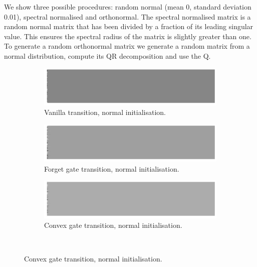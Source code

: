 We show three possible procedures: random normal (mean 0, standard deviation 0.01), spectral
normalised and orthonormal. The spectral normalised matrix is a random normal matrix that
has been divided by a fraction of its leading singular value. This ensures the spectral
radius of the matrix is slightly greater than one. To generate a random orthonormal matrix
we generate a random matrix from a normal distribution, compute its QR decomposition and use the
Q.

\begin{figure}
\centering
\begin{subfigure}[t]{0.3\textwidth}
\includegraphics[width=\textwidth]{appendix/init/vanillanormal}
\caption{Vanilla transition, normal initialisation.}
\end{subfigure}\hfill
\begin{subfigure}[t]{0.3\textwidth}
\includegraphics[width=\textwidth]{appendix/init/lstmnormal}
\caption{Forget gate transition, normal initialisation.}
\end{subfigure}\hfill
\begin{subfigure}[t]{0.3\textwidth}
\includegraphics[width=\textwidth]{appendix/init/grunormal}
\caption{Convex gate transition, normal initialisation.}
\end{subfigure}\\


\end{figure}
